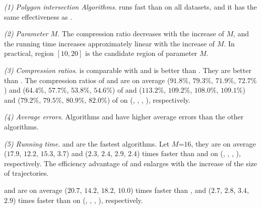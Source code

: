 \ni\emph{(1) Polygon intersection Algorithms}. \rpia runs fast than \cpia on all datasets, and it has the same effectiveness as \cpia.

\ni\emph{(2) Parameter $M$}. The compression ratio decreases with the increase of $M$, and the running time increases approximately linear with the increase of $M$. In practical, region $[10, 20]$ is the candidate region of parameter $M$.

\ni\emph{(3) Compression ratios}. \cist is comparable with \dps and \cista is better than \dps.
They are better than \squishe.
The compression ratios of \cist and \cista are on average ($91.8\%$, $79.3\%$, $71.9\%$, {$72.7\%$}) and ($64.4\%$, $57.7\%$, $53.8\%$, {$54.6\%$}) of \squishe and ($113.2\%$, $109.2\%$, $108.0\%$, $109.1\%$) and ($79.2\%$, $79.5\%$, $80.9\%$, $82.0\%$) of \dps on (\truck, \sercar, \geolife, \pricar), respectively.


\ni\emph{(4) Average errors}. {Algorithms \cist and \cista have higher average errors than the other algorithms.}

\ni\emph{(5) Running time}. \cist and \cista are the fastest algorithms. Let $M$=$16$, they are on average ($17.9$, $12.2$, $15.3$, $3.7$) and ($2.3$, $2.4$, $2.9$, {$2.4$}) times faster than \dps and \squishe on (\truck, \sercar, \geolife, \pricar), respectively.
The efficiency advantage of \cist and \cista enlarges with the increase of the size of trajectories.


\cist and \cista are on average ($20.7$, $14.2$, $18.2$, $10.0$) times faster than \dps, and ($2.7$, $2.8$, $3.4$, {$2.9$}) times faster than \squishe on (\truck, \sercar, {\geolife}, \pricar), respectively.







